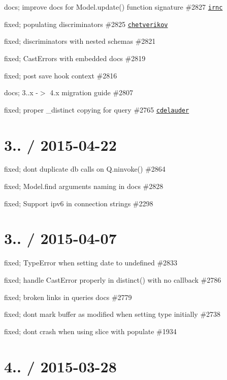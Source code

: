 \begin{DoxyItemize}
\item docs; improve docs for Model.\+update() function signature \#2827 \href{https://github.com/irnc}{\tt irnc}
\item fixed; populating discriminators \#2825 \href{https://github.com/chetverikov}{\tt chetverikov}
\item fixed; discriminators with nested schemas \#2821
\item fixed; Cast\+Errors with embedded docs \#2819
\item fixed; post save hook context \#2816
\item docs; 3..\+x -\/$>$ 4.\+x migration guide \#2807
\item fixed; proper \+\_\+distinct copying for query \#2765 \href{https://github.com/cdelauder}{\tt cdelauder}
\end{DoxyItemize}

\section*{3.. / 2015-\/04-\/22 }


\begin{DoxyItemize}
\item fixed; dont duplicate db calls on Q.\+ninvoke() \#2864
\item fixed; Model.\+find arguments naming in docs \#2828
\item fixed; Support ipv6 in connection strings \#2298
\end{DoxyItemize}

\section*{3.. / 2015-\/04-\/07 }


\begin{DoxyItemize}
\item fixed; Type\+Error when setting date to undefined \#2833
\item fixed; handle Cast\+Error properly in distinct() with no callback \#2786
\item fixed; broken links in queries docs \#2779
\item fixed; dont mark buffer as modified when setting type initially \#2738
\item fixed; dont crash when using slice with populate \#1934
\end{DoxyItemize}

\section*{4.. / 2015-\/03-\/28 }


